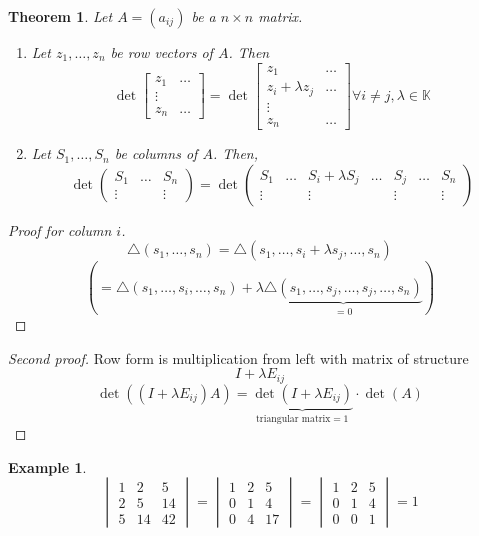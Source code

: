 \documentclass{article}
\newcounter{lecref}[section]
\numberwithin{lecref}{section}
\newtheorem{theorem}[lecref]{Theorem}
\newtheorem{example}[lecref]{Example}
\begin{document}
\begin{theorem} %
  Let $A = (a_{ij})$ be a $n\times n$ matrix.
  \begin{enumerate}
    \item Let $z_1, \dots, z_n$ be row vectors of $A$. Then
      \[ \det\begin{bmatrix} z_1 & \ldots \\ \vdots & \\ z_n & \ldots \end{bmatrix} = \det\begin{bmatrix} z_1 & \ldots \\ z_i + \lambda z_j & \ldots \\ \vdots & \\ z_n & \ldots \end{bmatrix} \forall i \neq j, \lambda \in \mathbb K \]
    \item
      Let $S_1, \dots, S_n$ be columns of $A$. Then,
      \[ \det\begin{pmatrix} S_1 & \ldots & S_n \\ \vdots & & \vdots \end{pmatrix} = \det\begin{pmatrix} S_1 & \ldots & S_i + \lambda S_j & \ldots & S_j & \ldots & S_n \\ \vdots & & \vdots & & \vdots & & \vdots \end{pmatrix} \]
  \end{enumerate}
\end{theorem}
\begin{proof}[Proof for column $i$]
  \[ \triangle(s_1, \dots, s_n)= \triangle(s_1, \dots, s_i + \lambda s_j, \dots, s_n) \]
  \[ \left( = \triangle(s_1, \dots, s_i, \dots, s_n) + \lambda \underbrace{\triangle(s_1, \dots, s_j, \dots, s_j, \dots, s_n)}_{=0} \right) \]
\end{proof}
\begin{proof}[Second proof]
  Row form is multiplication from left with matrix of structure
  \[ I + \lambda E_{ij} \]
  \[ \det((I + \lambda E_{ij}) A) = \underbrace{\det(I + \lambda E_{ij})}_{\text{triangular matrix} = 1} \cdot \det(A) \]
\end{proof}
\begin{example} %
  \[
    \begin{vmatrix}
      1 & 2 & 5 \\
      2 & 5 & 14 \\
      5 & 14 & 42
    \end{vmatrix}
    =
    \begin{vmatrix}
      1 & 2 & 5 \\
      0 & 1 & 4 \\
      0 & 4 & 17
    \end{vmatrix}
    =
    \begin{vmatrix}
      1 & 2 & 5 \\
      0 & 1 & 4 \\
      0 & 0 & 1
    \end{vmatrix}
    = 1
  \]
\end{example}
\end{document}
